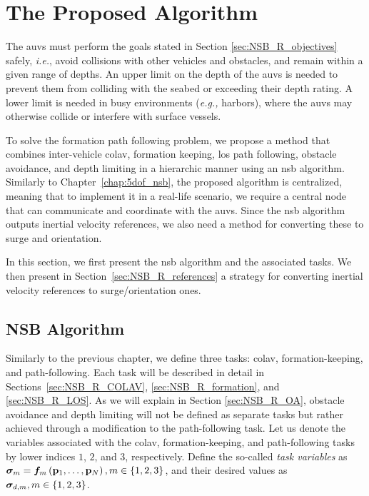 \section{The Proposed Algorithm}
\label{sec:NSB_R_control}

The \glspl{auv} must perform the goals stated in Section \ref{sec:NSB_R_objectives} safely, \emph{i.e.},
avoid collisions with other vehicles and obstacles, and remain within a given range of depths.
An upper limit on the depth of the \glspl{auv} is needed to prevent them from colliding with the seabed or exceeding their depth rating.
A lower limit is needed in busy environments (\emph{e.g.,} harbors), where the \glspl{auv} may otherwise collide or interfere with surface vessels.

To solve the formation path following problem, we propose a method that combines inter-vehicle \acrfull{colav}, formation keeping, \acrfull{los} path following, obstacle avoidance, and depth limiting in a hierarchic manner using an \gls{nsb} algorithm.
Similarly to Chapter~\ref{chap:5dof_nsb}, the proposed algorithm is centralized, meaning that to implement it in a real-life scenario, we require a central node that can communicate and coordinate with the \glspl{auv}.
Since the \gls{nsb} algorithm outputs inertial velocity references, we also need a method for converting these to surge and orientation.

In this section, we first present the \gls{nsb} algorithm and the associated tasks.
We then present in Section~\ref{sec:NSB_R_references} a strategy for converting inertial velocity references to surge/orientation ones.

\subsection{NSB Algorithm}
\label{sec:NSB_R_NSB}

Similarly to the previous chapter, we define three tasks: \gls{colav}, formation-keeping, and path-following.
Each task will be described in detail in Sections~\ref{sec:NSB_R_COLAV}, \ref{sec:NSB_R_formation}, and \ref{sec:NSB_R_LOS}.
As we will explain in Section \ref{sec:NSB_R_OA}, obstacle avoidance and depth limiting will not be defined as separate tasks but rather achieved through a modification to the path-following task.
Let us denote the variables associated with the \gls{colav}, formation-keeping, and path-following tasks by lower indices $1$, $2$, and $3$, respectively.
Define the so-called \emph{task variables} as $\bm{\sigma}_m = \bm{f}_m\left(\mathbf{p}_1, \ldots, \mathbf{p}_N\right), m \in \left\{1,2,3\right\}$, and their desired values as $\bm{\sigma}_{d,m}, m \in \left\{1,2,3\right\}$.

